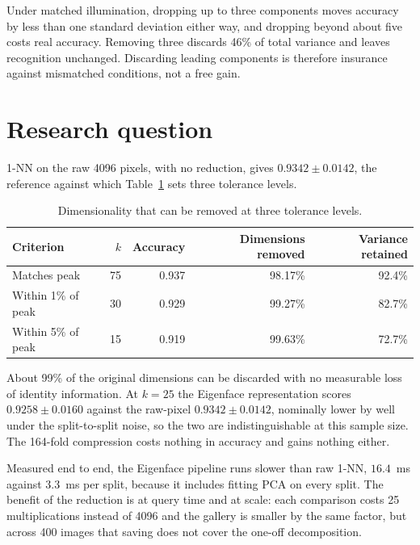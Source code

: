 \documentclass[10pt,a4paper]{article}
\begin{document}
Under matched illumination, dropping up to three components moves accuracy by
less than one standard deviation either way, and dropping beyond about five
costs real accuracy. Removing three discards 46\% of total variance and leaves
recognition unchanged. Discarding leading components is therefore insurance
against mismatched conditions, not a free gain.

\section{Research question}

1-NN on the raw 4096 pixels, with no reduction, gives $0.9342\pm0.0142$, the
reference against which Table~\ref{tab:rq} sets three tolerance levels.

\begin{table}[htbp]
\centering
\caption{Dimensionality that can be removed at three tolerance levels.}
\label{tab:rq}
\begin{tabular}{lrrrr}
\toprule
Criterion & $k$ & Accuracy & Dimensions removed & Variance retained\\
\midrule
Matches peak      & 75 & 0.937 & 98.17\% & 92.4\%\\
Within 1\% of peak & 30 & 0.929 & 99.27\% & 82.7\%\\
Within 5\% of peak & 15 & 0.919 & 99.63\% & 72.7\%\\
\bottomrule
\end{tabular}
\end{table}

About 99\% of the original dimensions can be discarded with no measurable loss
of identity information. At $k=25$ the Eigenface representation scores
$0.9258\pm0.0160$ against the raw-pixel $0.9342\pm0.0142$, nominally lower by
well under the split-to-split noise, so the two are indistinguishable at this
sample size. The 164-fold compression costs nothing in accuracy and gains
nothing either.

Measured end to end, the Eigenface pipeline runs slower than raw 1-NN,
$16.4$~ms against $3.3$~ms per split, because it includes fitting PCA on every
split. The benefit of the reduction is at query time and at scale: each comparison
costs 25 multiplications instead of 4096 and the gallery is smaller by the same
factor, but across 400 images that saving does not cover the
one-off decomposition.
\end{document}
